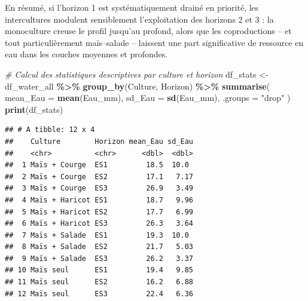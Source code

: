 \documentclass[
]{article}
\newenvironment{Shaded}{\begin{snugshade}}{\end{snugshade}}
\newcommand{\AttributeTok}[1]{\textcolor[rgb]{0.13,0.29,0.53}{#1}}
\newcommand{\CommentTok}[1]{\textcolor[rgb]{0.56,0.35,0.01}{\textit{#1}}}
\newcommand{\FunctionTok}[1]{\textcolor[rgb]{0.13,0.29,0.53}{\textbf{#1}}}
\newcommand{\NormalTok}[1]{#1}
\newcommand{\OtherTok}[1]{\textcolor[rgb]{0.56,0.35,0.01}{#1}}
\newcommand{\SpecialCharTok}[1]{\textcolor[rgb]{0.81,0.36,0.00}{\textbf{#1}}}
\newcommand{\StringTok}[1]{\textcolor[rgb]{0.31,0.60,0.02}{#1}}
\begin{document}
En résumé, si l'horizon 1 est systématiquement drainé en priorité, les
intercultures modulent sensiblement l'exploitation des horizons 2 et 3 :
la monoculture creuse le profil jusqu'au profond, alors que les
coproductions -- et tout particulièrement maïs--salade -- laissent une
part significative de ressource en eau dans les couches moyennes et
profondes.

\begin{Shaded}
\begin{Highlighting}[]
\CommentTok{\# Calcul des statistiques descriptives par culture et horizon}
\NormalTok{df\_stats }\OtherTok{\textless{}{-}}\NormalTok{ df\_water\_all }\SpecialCharTok{\%\textgreater{}\%}
  \FunctionTok{group\_by}\NormalTok{(Culture, Horizon) }\SpecialCharTok{\%\textgreater{}\%}
  \FunctionTok{summarise}\NormalTok{(}
    \AttributeTok{mean\_Eau =} \FunctionTok{mean}\NormalTok{(Eau\_mm),}
    \AttributeTok{sd\_Eau   =} \FunctionTok{sd}\NormalTok{(Eau\_mm),}
    \AttributeTok{.groups  =} \StringTok{"drop"}
\NormalTok{  )}
\FunctionTok{print}\NormalTok{(df\_stats)}
\end{Highlighting}
\end{Shaded}

\begin{verbatim}
## # A tibble: 12 x 4
##    Culture        Horizon mean_Eau sd_Eau
##    <chr>          <chr>      <dbl>  <dbl>
##  1 Maïs + Courge  ES1         18.5  10.0 
##  2 Maïs + Courge  ES2         17.1   7.17
##  3 Maïs + Courge  ES3         26.9   3.49
##  4 Maïs + Haricot ES1         18.7   9.96
##  5 Maïs + Haricot ES2         17.7   6.99
##  6 Maïs + Haricot ES3         26.3   3.64
##  7 Maïs + Salade  ES1         19.3  10.0 
##  8 Maïs + Salade  ES2         21.7   5.03
##  9 Maïs + Salade  ES3         26.2   3.37
## 10 Maïs seul      ES1         19.4   9.85
## 11 Maïs seul      ES2         16.2   6.88
## 12 Maïs seul      ES3         22.4   6.36
\end{verbatim}
\end{document}
